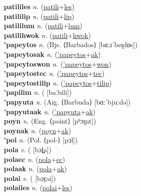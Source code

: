\textbf{patililes} \textit{n.} (\hyperref[patili]{patili}+\hyperref[les]{les})
 \label{patililes} \\
\textbf{patililip} \textit{n.} (\hyperref[patili]{patili}+\hyperref[lip]{lip})
 \label{patililip} \\
\textbf{patililum} \textit{n.} (\hyperref[patili]{patili}+\hyperref[lum]{lum})
 \label{patililum} \\
\textbf{patilihwok} \textit{n.} (\hyperref[patili]{patili}+\hyperref[hwok]{hwok})
 \label{patilihwok} \\
\textbf{'papeytos} \textit{n.} (Bjs. ⟨Barbados⟩ [bɑːɹˈbeɪ̯dɒs])
 \label{'papeytos} \\
\textbf{'papeytosak} \textit{n.} (\hyperref['papeytos]{'papeytos}+\hyperref[ak]{ak})
 \label{'papeytosak} \\
\textbf{'papeytoswon} \textit{n.} (\hyperref['papeytos]{'papeytos}+\hyperref[won]{won})
 \label{'papeytoswon} \\
\textbf{'papeytostec} \textit{n.} (\hyperref['papeytos]{'papeytos}+\hyperref[tec]{tec})
 \label{'papeytostec} \\
\textbf{'papeytostilip} \textit{n.} (\hyperref['papeytos]{'papeytos}+\hyperref[tilip]{tilip})
 \label{'papeytostilip} \\
\textbf{'papilim} \textit{n.} ( [baːbili])
 \label{'papilim} \\
\textbf{'papyuta} \textit{n.} (Aig. ⟨Barbuda⟩ [bɑːˈbjuːdə])
 \label{'papyuta} \\
\textbf{'papyutaak} \textit{n.} (\hyperref['papyuta]{'papyuta}+\hyperref[ak]{ak})
 \label{'papyutaak} \\
\textbf{poyn} \textit{n.} (Eng. ⟨point⟩ [pʰɔɪ̯nt])
 \label{poyn} \\
\textbf{poynak} \textit{n.} (\hyperref[poyn]{poyn}+\hyperref[ak]{ak})
 \label{poynak} \\
\textbf{'pol} \textit{n.} (Pol. ⟨pol-⟩ [pɔl])
 \label{'pol} \\
\textbf{pola} \textit{v.} ( [bɔl̪a])
 \label{pola} \\
\textbf{polaec} \textit{n.} (\hyperref[pola]{pola}+\hyperref[ec]{ec})
 \label{polaec} \\
\textbf{polaak} \textit{n.} (\hyperref[pola]{pola}+\hyperref[ak]{ak})
 \label{polaak} \\
\textbf{polai} \textit{v.} ( [bɔɽai])
 \label{polai} \\
\textbf{polailes} \textit{n.} (\hyperref[polai]{polai}+\hyperref[les]{les})
 \label{polailes} \\
